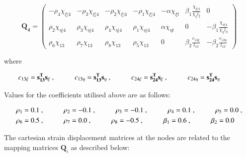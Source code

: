 \begin{equation} 
\mathbf{Q_4} =
\begin{pmatrix}
-\rho_4 \chi_{\xi | 4} & -\rho_3 \chi_{\xi | 4} & -\rho_2 \chi_{\xi | 4} & -\rho_1 \chi_{\xi | 4} & -\alpha \chi_{\xi t} & \beta_1 \frac{\chi_{\xi | 4}}{\bar{\chi_\xi} l_\xi} & 0  \\	
\rho_2 \chi_{\eta | 4} & \rho_3 \chi_{\eta | 4} & \rho_4 \chi_{\eta | 4} & \rho_1 \chi_{\eta | 4} & \alpha \chi_{\eta t} & 0 & -\beta_1 \frac{\chi_{\eta | 4}}{\bar{\chi_\eta} l_\eta} \\
\rho_6 \chi_{13} & \rho_7 \chi_{13} & \rho_8 \chi_{13} & \rho_5 \chi_{13} & 0 & \beta_2 \frac{c_{13 \xi}}{l_{13}} & -\beta_2 \frac{c_{13 \eta}}{l_{13}}
\end{pmatrix}		
\label{equation15}
\end{equation}

where

\begin{align*} 
	c_{13 \xi} = \mathbf{s_{13}^T} \mathbf{s_\xi}\ ,
	\hspace{10mm}
	c_{13 \eta} = \mathbf{s_{13}^T} \mathbf{s_\eta}\ ,
	\hspace{10mm}
	c_{24 \xi} = \mathbf{s_{24}^T} \mathbf{s_\xi}\ ,
	\hspace{10mm}
	c_{24 \eta} = \mathbf{s_{24}^T} \mathbf{s_\eta}
	\hspace{10mm}
\end{align*}

Values for the coefficients utilised above are as follows:

\begin{gather} 
	\begin{aligned}
		&\rho_1 = 0.1\ ,
		\hspace{10mm}
		\rho_2 = -0.1\ ,
		\hspace{10mm}
		\rho_3 = -0.1\ ,
		\hspace{10mm}
		\rho_4 = 0.1\ ,
		\hspace{10mm}
		\rho_5 = 0.0\ , \\
		&\rho_6 = 0.5\ ,
		\hspace{10mm}
		\rho_7 = 0.0\ ,
		\hspace{10mm}
		\rho_8 = -0.5\ ,
		\hspace{10mm}
		\beta_1 = 0.6\ ,
		\hspace{10mm}
		\beta_2 = 0.0
		\label{equation16}
	\end{aligned}
\end{gather}


The cartesian strain displacement matrices at the nodes are related to the mapping matrices $\mathbf{Q}_i$ as described below:


